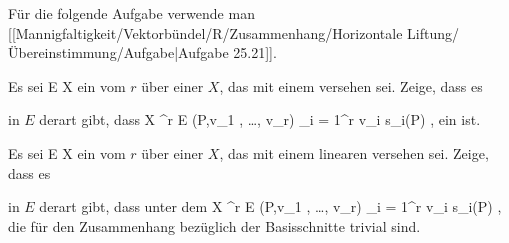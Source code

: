 Für die folgende Aufgabe verwende man
[[Mannigfaltigkeit/Vektorbündel/R/Zusammenhang/Horizontale Liftung/Übereinstimmung/Aufgabe|Aufgabe 25.21]].

{}
{

Es sei
 { E } { X
} {}
ein
vom
$r$ über einer
$X$, das mit einem
versehen sei. Zeige, dass es
 {} {}

 in $E$ derart gibt, dass
\maabbeledisp {} {X \times \R^r} { E
} {(P,v_1  , \ldots , v_r)} { \sum_{i = 1}^r v_i s_i(P)
} {,}
ein
ist.

}
{} {}

{}
{

Es sei
 { E } { X
} {}
ein
vom
$r$ über einer
$X$, das mit einem linearen
versehen sei. Zeige, dass es
 {} {}

 in $E$ derart gibt, dass unter dem
\maabbeledisp {} {X \times \R^r} { E
} {(P,v_1 , \ldots , v_r)} { \sum_{i = 1}^r v_i s_i(P)
} {,}
die
für den Zusammenhang bezüglich der Basisschnitte
 trivial sind.

}
{} {}

